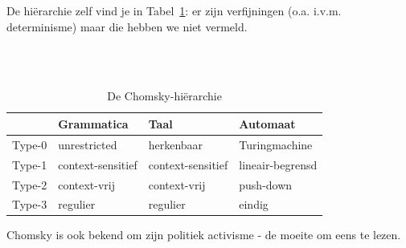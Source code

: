 De hi\"erarchie zelf vind je in Tabel~\ref{chomskyhier}: er zijn
verfijningen (o.a. i.v.m. determinisme) maar die hebben we niet vermeld.

~\\
~\\
\begin{table}[ht]
\center
\begin{tabular}{|l|l|l|l|}
\hline
         & Grammatica          & Taal              & Automaat \\ \hline
Type-0   & unrestricted        & herkenbaar        & Turingmachine \\
Type-1   & context-sensitief   & context-sensitief & lineair-begrensd  \\
Type-2   & context-vrij        & context-vrij      & push-down \\
Type-3   & regulier            & regulier          & eindig  \\
\hline
\end{tabular}
\caption{De Chomsky-hi\"erarchie} \label{chomskyhier}
\end{table}


Chomsky is ook bekend om zijn politiek activisme - de moeite om eens
te lezen.





% 

